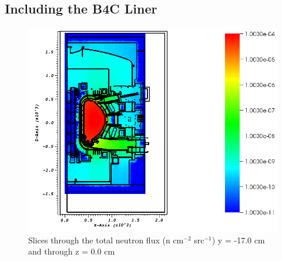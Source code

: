 \documentclass[12pt]{article}
\begin{document}
\subsection{Including the B4C Liner}
\begin{figure}[ht!]
  \centering
  \includegraphics[scale=0.4]{../plots/neutron/b4c/flux_y-17.png}
  \caption{Slices through the total neutron flux (n cm$^{-2}$ src$^{-1}$) y = -17.0 cm and through z = 0.0 cm}
  \label{fig:wwinp}
\end{figure}
\end{document}
